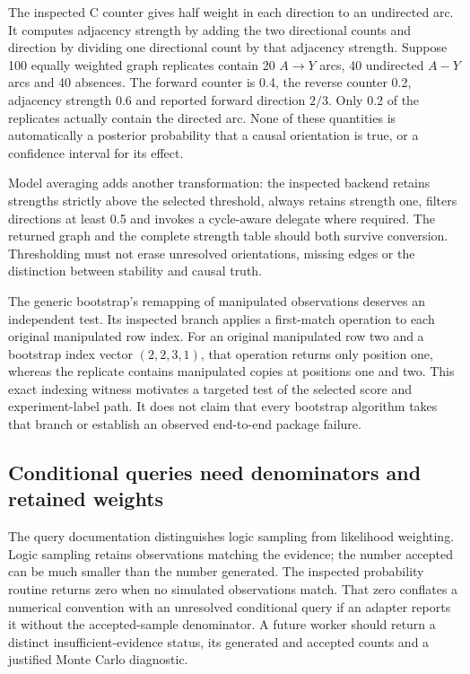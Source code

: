 The inspected C counter gives half weight in each direction to an undirected arc. It computes adjacency strength by adding the two directional counts and direction by dividing one directional count by that adjacency strength. Suppose 100 equally weighted graph replicates contain 20 $A\to Y$ arcs, 40 undirected $A-Y$ arcs and 40 absences. The forward counter is 0.4, the reverse counter 0.2, adjacency strength 0.6 and reported forward direction $2/3$. Only 0.2 of the replicates actually contain the directed arc. None of these quantities is automatically a posterior probability that a causal orientation is true, or a confidence interval for its effect.\citep{exec24_bnlearn_sources,exec24_bnlearn_contract}

Model averaging adds another transformation: the inspected backend retains strengths strictly above the selected threshold, always retains strength one, filters directions at least 0.5 and invokes a cycle-aware delegate where required. The returned graph and the complete strength table should both survive conversion. Thresholding must not erase unresolved orientations, missing edges or the distinction between stability and causal truth.\citep{exec24_bnlearn_sources,exec24_bnlearn_contract}

The generic bootstrap's remapping of manipulated observations deserves an independent test. Its inspected branch applies a first-match operation to each original manipulated row index. For an original manipulated row two and a bootstrap index vector $(2,2,3,1)$, that operation returns only position one, whereas the replicate contains manipulated copies at positions one and two. This exact indexing witness motivates a targeted test of the selected score and experiment-label path. It does not claim that every bootstrap algorithm takes that branch or establish an observed end-to-end package failure.\citep{exec24_bnlearn_sources,exec24_bnlearn_contract}

\subsection{Conditional queries need denominators and retained weights}
The query documentation distinguishes logic sampling from likelihood weighting. Logic sampling retains observations matching the evidence; the number accepted can be much smaller than the number generated. The inspected probability routine returns zero when no simulated observations match. That zero conflates a numerical convention with an unresolved conditional query if an adapter reports it without the accepted-sample denominator. A future worker should return a distinct insufficient-evidence status, its generated and accepted counts and a justified Monte Carlo diagnostic.\citep{exec24_bnlearn_sources,exec24_bnlearn_contract}

